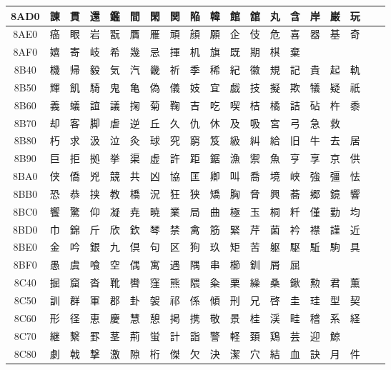 \begin{table}[H]
\begin{tabular}{|Sc|*{16}{>{\centering\arraybackslash}p{1em}|}>{\centering\arraybackslash}p{2.5em}|}
8AD0 & 諌 & 貫 & 還 & 鑑 & 間 & 閑 & 関 & 陥 & 韓 & 館 & 舘 & 丸 & 含 & 岸 & 巌 & 玩 \\ \hline
8AE0 & 癌 & 眼 & 岩 & 翫 & 贋 & 雁 & 頑 & 顔 & 願 & 企 & 伎 & 危 & 喜 & 器 & 基 & 奇 \\ \hline
8AF0 & 嬉 & 寄 & 岐 & 希 & 幾 & 忌 & 揮 & 机 & 旗 & 既 & 期 & 棋 & 棄 &   &   &   \\ \hline
8B40 & 機 & 帰 & 毅 & 気 & 汽 & 畿 & 祈 & 季 & 稀 & 紀 & 徽 & 規 & 記 & 貴 & 起 & 軌 \\ \hline
8B50 & 輝 & 飢 & 騎 & 鬼 & 亀 & 偽 & 儀 & 妓 & 宜 & 戯 & 技 & 擬 & 欺 & 犠 & 疑 & 祇 \\ \hline
8B60 & 義 & 蟻 & 誼 & 議 & 掬 & 菊 & 鞠 & 吉 & 吃 & 喫 & 桔 & 橘 & 詰 & 砧 & 杵 & 黍 \\ \hline
8B70 & 却 & 客 & 脚 & 虐 & 逆 & 丘 & 久 & 仇 & 休 & 及 & 吸 & 宮 & 弓 & 急 & 救 & \\ \hline
8B80 & 朽 & 求 & 汲 & 泣 & 灸 & 球 & 究 & 窮 & 笈 & 級 & 糾 & 給 & 旧 & 牛 & 去 & 居 \\ \hline
8B90 & 巨 & 拒 & 拠 & 挙 & 渠 & 虚 & 許 & 距 & 鋸 & 漁 & 禦 & 魚 & 亨 & 享 & 京 & 供 \\ \hline
8BA0 & 侠 & 僑 & 兇 & 競 & 共 & 凶 & 協 & 匡 & 卿 & 叫 & 喬 & 境 & 峡 & 強 & 彊 & 怯 \\ \hline
8BB0 & 恐 & 恭 & 挟 & 教 & 橋 & 況 & 狂 & 狭 & 矯 & 胸 & 脅 & 興 & 蕎 & 郷 & 鏡 & 響 \\ \hline
8BC0 & 饗 & 驚 & 仰 & 凝 & 尭 & 暁 & 業 & 局 & 曲 & 極 & 玉 & 桐 & 粁 & 僅 & 勤 & 均 \\ \hline
8BD0 & 巾 & 錦 & 斤 & 欣 & 欽 & 琴 & 禁 & 禽 & 筋 & 緊 & 芹 & 菌 & 衿 & 襟 & 謹 & 近 \\ \hline
8BE0 & 金 & 吟 & 銀 & 九 & 倶 & 句 & 区 & 狗 & 玖 & 矩 & 苦 & 躯 & 駆 & 駈 & 駒 & 具 \\ \hline
8BF0 & 愚 & 虞 & 喰 & 空 & 偶 & 寓 & 遇 & 隅 & 串 & 櫛 & 釧 & 屑 & 屈 & & & \\ \hline
8C40 & 掘 & 窟 & 沓 & 靴 & 轡 & 窪 & 熊 & 隈 & 粂 & 栗 & 繰 & 桑 & 鍬 & 勲 & 君 & 薫 \\ \hline
8C50 & 訓 & 群 & 軍 & 郡 & 卦 & 袈 & 祁 & 係 & 傾 & 刑 & 兄 & 啓 & 圭 & 珪 & 型 & 契 \\ \hline
8C60 & 形 & 径 & 恵 & 慶 & 慧 & 憩 & 掲 & 携 & 敬 & 景 & 桂 & 渓 & 畦 & 稽 & 系 & 経 \\ \hline
8C70 & 継 & 繋 & 罫 & 茎 & 荊 & 蛍 & 計 & 詣 & 警 & 軽 & 頚 & 鶏 & 芸 & 迎 & 鯨 & \\ \hline
8C80 & 劇 & 戟 & 撃 & 激 & 隙 & 桁 & 傑 & 欠 & 決 & 潔 & 穴 & 結 & 血 & 訣 & 月 & 件 \\ \hline

\end{tabular}
\end{table}
